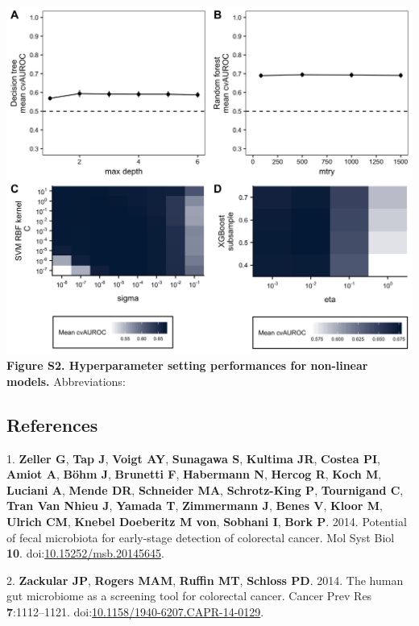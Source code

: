 \documentclass[11pt,]{article}
\begin{document}
\includegraphics{Figure_S2.png} \textbf{Figure S2. Hyperparameter
setting performances for non-linear models.} Abbreviations: \newpage

\subsection{References}\label{references}

\hypertarget{refs}{}
\hypertarget{ref-zeller_potential_2014}{}
1. \textbf{Zeller G}, \textbf{Tap J}, \textbf{Voigt AY},
\textbf{Sunagawa S}, \textbf{Kultima JR}, \textbf{Costea PI},
\textbf{Amiot A}, \textbf{Böhm J}, \textbf{Brunetti F},
\textbf{Habermann N}, \textbf{Hercog R}, \textbf{Koch M},
\textbf{Luciani A}, \textbf{Mende DR}, \textbf{Schneider MA},
\textbf{Schrotz-King P}, \textbf{Tournigand C}, \textbf{Tran Van Nhieu
J}, \textbf{Yamada T}, \textbf{Zimmermann J}, \textbf{Benes V},
\textbf{Kloor M}, \textbf{Ulrich CM}, \textbf{Knebel Doeberitz M von},
\textbf{Sobhani I}, \textbf{Bork P}. 2014. Potential of fecal microbiota
for early-stage detection of colorectal cancer. Mol Syst Biol
\textbf{10}.
doi:\href{https://doi.org/10.15252/msb.20145645}{10.15252/msb.20145645}.

\hypertarget{ref-zackular_human_2014}{}
2. \textbf{Zackular JP}, \textbf{Rogers MAM}, \textbf{Ruffin MT},
\textbf{Schloss PD}. 2014. The human gut microbiome as a screening tool
for colorectal cancer. Cancer Prev Res \textbf{7}:1112--1121.
doi:\href{https://doi.org/10.1158/1940-6207.CAPR-14-0129}{10.1158/1940-6207.CAPR-14-0129}.
\end{document}
